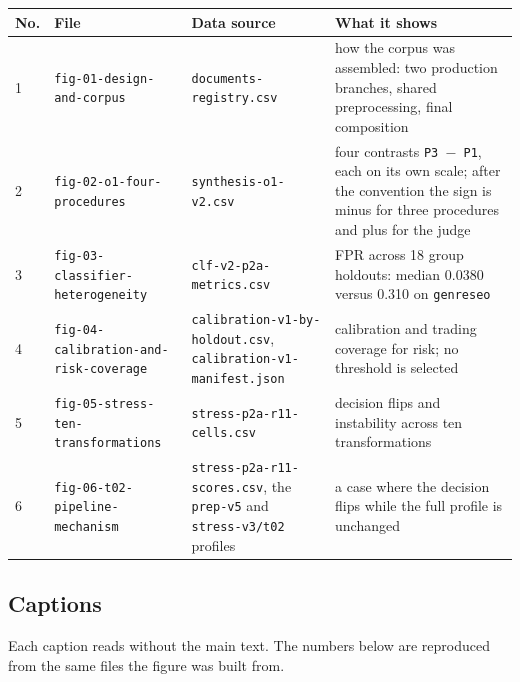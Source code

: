 \documentclass[11pt,a4paper]{article}
\renewcommand{\_}{\textunderscore\allowbreak}
\begin{document}
\begin{center}
\small
\begin{tabularx}{\textwidth}{llXX}
\toprule
No. & File & Data source & What it shows \\
\midrule
1 & \texttt{fig-\allowbreak{}01-\allowbreak{}design-\allowbreak{}and-\allowbreak{}corpus} & \texttt{documents-\allowbreak{}registry.csv} & how the corpus was assembled: two production branches, shared preprocessing, final composition \\
2 & \texttt{fig-\allowbreak{}02-\allowbreak{}o1-\allowbreak{}four-\allowbreak{}procedures} & \texttt{synthesis-\allowbreak{}o1-\allowbreak{}v2.csv} & four contrasts \texttt{P3 $-$ P1}, each on its own scale; after the convention the sign is minus for three procedures and plus for the judge \\
3 & \texttt{fig-\allowbreak{}03-\allowbreak{}classifier-\allowbreak{}heterogeneity} & \texttt{clf-\allowbreak{}v2-\allowbreak{}p2a-\allowbreak{}metrics.csv} & FPR across 18 group holdouts: median 0.0380 versus 0.310 on \texttt{genre\_seo} \\
4 & \texttt{fig-\allowbreak{}04-\allowbreak{}calibration-\allowbreak{}and-\allowbreak{}risk-\allowbreak{}coverage} & \texttt{calibration-\allowbreak{}v1-\allowbreak{}by-\allowbreak{}holdout.csv}, \texttt{calibration-\allowbreak{}v1-\allowbreak{}manifest.json} & calibration and trading coverage for risk; no threshold is selected \\
5 & \texttt{fig-\allowbreak{}05-\allowbreak{}stress-\allowbreak{}ten-\allowbreak{}transformations} & \texttt{stress-\allowbreak{}p2a-\allowbreak{}r11-\allowbreak{}cells.csv} & decision flips and instability across ten transformations \\
6 & \texttt{fig-\allowbreak{}06-\allowbreak{}t02-\allowbreak{}pipeline-\allowbreak{}mechanism} & \texttt{stress-\allowbreak{}p2a-\allowbreak{}r11-\allowbreak{}scores.csv}, the \texttt{prep-\allowbreak{}v5} and \texttt{stress-\allowbreak{}v3/t02} profiles & a case where the decision flips while the full profile is unchanged \\
\bottomrule
\end{tabularx}
\end{center}

\subsection{Captions}

Each caption reads without the main text. The numbers below are reproduced from the
same files the figure was built from.
\end{document}
